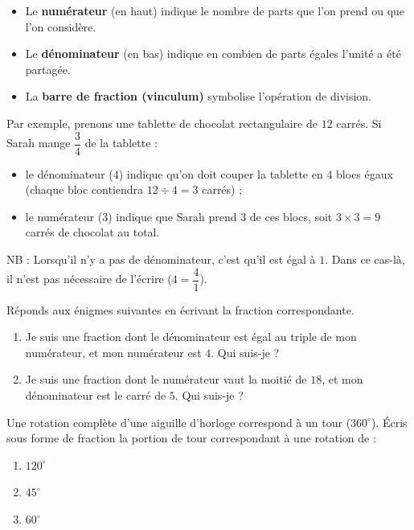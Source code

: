 \documentclass[../../syllabus_1.tex]{subfiles}
\begin{document}
\begin{itemize}
\begin{itemize}
    \item Le \textbf{numérateur} (en haut) indique le nombre de parts que l'on prend ou que l'on considère.
    \item Le \textbf{dénominateur} (en bas) indique en combien de parts égales l'unité a été partagée.
    \item La \textbf{barre de fraction (vinculum)} symbolise l'opération de division.
\end{itemize}
 
Par exemple, prenons une tablette de chocolat rectangulaire de $12$ carrés. Si Sarah mange $\dfrac{3}{4}$ de la tablette :
\begin{itemize}
    \item le dénominateur ($4$) indique qu'on doit couper la tablette en $4$ blocs égaux (chaque bloc contiendra $12 \div 4 = 3$ carrés) ;
    \item le numérateur ($3$) indique que Sarah prend $3$ de ces blocs, soit $3 \times 3 = 9$ carrés de chocolat au total.
\end{itemize}

NB : Lorsqu'il n'y a pas de dénominateur, c'est qu'il est égal à $1$. Dans ce cas-là, il n'est pas nécessaire de l'écrire (\(4 = \dfrac{4}{1}\)).
\begin{exercise}
    Réponds aux énigmes suivantes en écrivant la fraction correspondante.
    \begin{enumerate}
        \item Je suis une fraction dont le dénominateur est égal au triple de mon numérateur, et mon numérateur est $4$. Qui suis-je ? \dotfill
        \vspace{1cm}
        \item Je suis une fraction dont le numérateur vaut la moitié de $18$, et mon dénominateur est le carré de $5$. Qui suis-je ? \dotfill
    \end{enumerate}
\end{exercise}
 
\begin{exercise}
    Une rotation complète d'une aiguille d'horloge correspond à un tour ($360^\circ$). Écris sous forme de fraction la portion de tour correspondant à une rotation de :
    \begin{enumerate}[cols=3, itemsep=1cm]
        \item $120^\circ$ \dotfill
        \item $45^\circ$ \dotfill
        \item $60^\circ$ \dotfill
    \end{enumerate}
\end{exercise}


\end{itemize}
\end{document}
